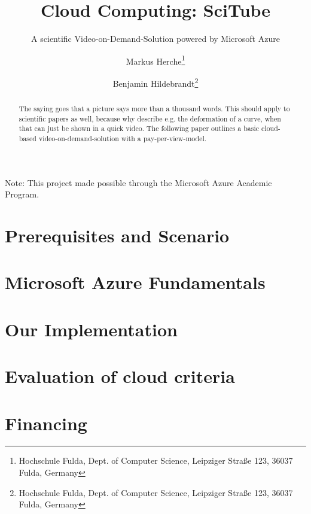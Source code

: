 \documentclass[english]{lni}
\begin{document}
\title{Cloud Computing: SciTube}
\subtitle{A scientific Video-on-Demand-Solution powered by Microsoft Azure}
\author[Markus Herche \and Benjamin Hildebrandt]
{Markus Herche\footnote{Hochschule Fulda, Dept. of Computer Science, Leipziger Straße 123, 36037 Fulda,
Germany } \and
Benjamin Hildebrandt\footnote{Hochschule Fulda, Dept. of Computer Science, Leipziger Straße 123, 36037 Fulda,
Germany
}}



\maketitle

\begin{abstract}
    The saying goes that a picture says more than a thousand words. This should apply to scientific papers as well,
    because why describe e.g. the deformation of a curve, when that can just be shown in a quick video. The following 
    paper outlines a basic cloud-based video-on-demand-solution with a pay-per-view-model. 
\end{abstract}

Note: This project made possible through the Microsoft Azure Academic Program.

\section{Prerequisites and Scenario}

\section{Microsoft Azure Fundamentals}


\section{Our Implementation}

\section{Evaluation of cloud criteria}

\section{Financing}

\end{document}
